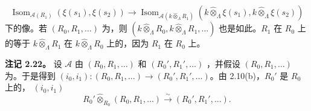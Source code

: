 \[\operatorname{Isom}_{\mathcal A(R_1)}(\xi(s_1),\xi(s_2))\longrightarrow
\operatorname{Isom}_{\mathcal A(k\widehat\otimes_\Lambda R_1)}
(k\widehat\otimes_\Lambda\xi(s_1),k\widehat\otimes_\Lambda\xi(s_2))\]
下的像。若 $(R_0,R_1,\ldots)$ 为，则 $(k\widehat\otimes_\Lambda R_0,k\widehat\otimes_\Lambda R_1,\ldots)$ 也是如此。$R_1$ 在 $R_0$ 上的等于 $k\widehat\otimes_\Lambda R_1$ 在 $k\widehat\otimes_\Lambda R_0$ 上的，因为 $R_1$ 在 $R_0$ 上。

\textbf{注记 2.22。} 设 $\mathcal A$ 由 $(R_0,R_1,\ldots)$ 和 $(R_0',R_1',\ldots)$ ，并假设 $(R_0,R_1,\ldots)$ 为。于是得到 $(i_0,i_1):(R_0,R_1,\ldots)\to(R_0',R_1',\ldots)$。由 2.10(b)，$R_0'$ 是 $R_0$ 上的， $(i_0,i_1)$ 
\[R_0'\widehat\otimes_{R_0}(R_0,R_1,\ldots)\xrightarrow\sim(R_0',R_1',\ldots).\]
